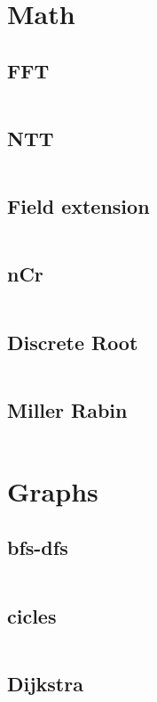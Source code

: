 \documentclass[10pt]{article}
\begin{document}
			\section{Math}
				\subsection{FFT}
					\inputminted[tabsize=2,breaklines,fontsize=\small, style=bw]{c++}{FFT/FFT.cpp}
				\subsection{NTT}
					\inputminted[tabsize=2,breaklines,fontsize=\small, style=bw]{c++}{FFT/NTT.cpp}
				\subsection{Field extension}
					\inputminted[tabsize=2,breaklines,fontsize=\small, style=bw]{c++}{DataStructures/EX.cpp}
				\subsection{nCr}
					\inputminted[tabsize=2,breaklines,fontsize=\small, style=bw]{c++}{Math/nCr.cpp}
				\subsection{Discrete Root}
					\inputminted[tabsize=2,breaklines,fontsize=\small, style=bw]{c++}{Math/discreteRoot.cpp}
				\subsection{Miller Rabin}
					\inputminted[tabsize=2,breaklines,fontsize=\small, style=bw]{c++}{Math/MillerRabin.cpp}
			\section{Graphs}
				\subsection{bfs-dfs}
					\inputminted[tabsize=2,breaklines,fontsize=\small, style=bw]{c++}{Graph/bfs-dfs.cpp}
				\subsection{cicles}
					\inputminted[tabsize=2,breaklines,fontsize=\small, style=bw]{c++}{Graph/cicleAndBipartite.cpp}
				\subsection{Dijkstra}
					\inputminted[tabsize=2,breaklines,fontsize=\small, style=bw]{c++}{Graph/dijkstra.cpp}
\end{document}

